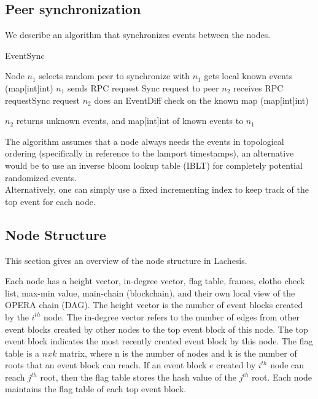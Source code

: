\documentclass{article}
\begin{document}
\subsection{Peer synchronization}

We describe an algorithm that synchronizes events between the nodes.

\begin{algorithm}[H]
	\caption{EventSync}\label{al:syncevents}
	\begin{algorithmic}[1]
		\State Node $n_1$ selects random peer to synchronize with
		\State $n_1$ gets local known events (map[int]int)
		\State $n_1$ sends RPC request Sync request to peer
		\State $n_2$ receives RPC requestSync request
		\State $n_2$ does an EventDiff check on the known map (map[int]int)
		
		\State $n_2$ returns unknown events, and map[int]int of known events to $n_1$		
		
		\EndProcedure
	\end{algorithmic}
\end{algorithm}

The algorithm assumes that a node always needs the events in topological ordering (specifically in reference to the lamport timestamps), an alternative would be to use an inverse bloom lookup table (IBLT) for completely potential randomized events. \\

Alternatively, one can simply use a fixed incrementing index to keep track of the top event for each node.\\

\subsection{Node Structure}
This section gives an overview of the node structure in Lachesis.

Each node has a height vector, in-degree vector, flag table, frames, clotho check list, max-min value, main-chain (blockchain), and their own local view of the OPERA chain (DAG). The height vector is the number of event blocks created by the $i^{th}$ node. The in-degree vector refers to the number of edges from other event blocks created by other nodes to the top event block of this node. The top event block indicates the most recently created event block by this node. The flag table is a $n x k$ matrix, where n is the number of nodes and k is the number of roots that an event block can reach. If an event block $e$ created by $i^{th}$ node can reach $j^{th}$ root, then the flag table stores the hash value of the $j^{th}$ root. Each node maintains the flag table of each top event block. 
\end{document}
